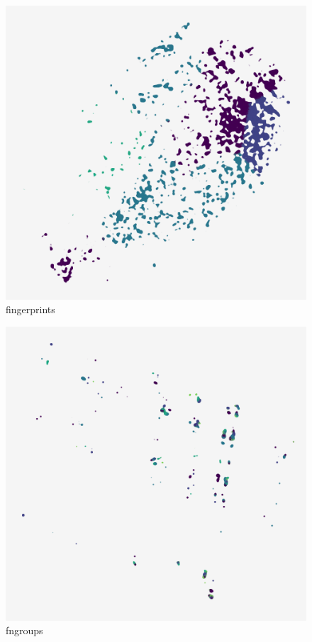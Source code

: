 \begin{subfigure}[b]{.25\linewidth}
    \centering
    \includegraphics[width=\textwidth]{outputs/DRplots/plots/AE_fingerprints.png}
    \caption{fingerprints}
    \label{fig:AE_fingerprints}
\end{subfigure}
\begin{subfigure}[b]{.25\linewidth}
    \centering
    \includegraphics[width=\textwidth]{outputs/DRplots/plots/AE_fngroups.png}
    \caption{fngroups}
    \label{fig:AE_fngroups}
\end{subfigure}
